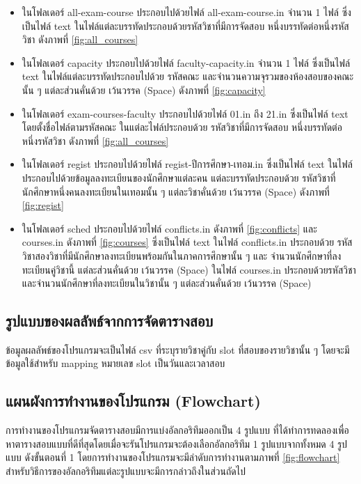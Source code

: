 \begin{itemize}
  \item ในโฟลเดอร์ all-exam-course ประกอบไปด้วยไฟล์ all-exam-course.in จำนวน 1 ไฟล์ ซึ่งเป็นไฟล์ text ในไฟล์แต่ละบรรทัดประกอบด้วยรหัสวิชาที่มีการจัดสอบ หนึ่งบรรทัดต่อหนึ่งรหัสวิชา ดังภาพที่ \ref{fig:all_courses}
  \item ในโฟลเดอร์ capacity ประกอบไปด้วยไฟล์ faculty-capacity.in จำนวน 1 ไฟล์ ซึ่งเป็นไฟล์ text ในไฟล์แต่ละบรรทัดประกอบไปด้วย รหัสคณะ และจำนวนความจุรวมของห้องสอบของคณะนั้น ๆ แต่ละส่วนคั่นด้วย เว้นวรรค (Space) ดังภาพที่ \ref{fig:capacity}
  \item ในโฟลเดอร์ exam-courses-faculty ประกอบไปด้วยไฟล์ 01.in ถึง 21.in ซึ่งเป็นไฟล์ text โดยตั้งชื่อไฟล์ตามรหัสคณะ ในแต่ละไฟล์ประกอบด้วย รหัสวิชาที่มีการจัดสอบ หนึ่งบรรทัดต่อหนึ่งรหัสวิชา ดังภาพที่ \ref{fig:all_courses} 
  \item ในโฟลเดอร์ regist ประกอบไปด้วยไฟล์ regist-ปีการศึกษา-เทอม.in ซึ่งเป็นไฟล์ text ในไฟล์ประกอบไปด้วยข้อมูลลงทะเบียนของนักศึกษาแต่ละคน แต่ละบรรทัดประกอบด้วย รหัสวิชาที่นักศึกษาหนึ่งคนลงทะเบียนในเทอมนั้น ๆ แต่ละวิชาคั่นด้วย เว้นวรรค (Space) ดังภาพที่ \ref{fig:regist}
  \item ในโฟลเดอร์ sched ประกอบไปด้วยไฟล์ conflicts.in ดังภาพที่ \ref{fig:conflicts} และ courses.in ดังภาพที่ \ref{fig:courses} ซึ่งเป็นไฟล์ text ในไฟล์ conflicts.in ประกอบด้วย รหัสวิชาสองวิชาที่มีนักศึกษาลงทะเบียนพร้อมกันในภาคการศึกษานั้น ๆ และ จำนวนนักศึกษาที่ลงทะเบียนคู่วิชานี้ แต่ละส่วนคั่นด้วย เว้นวรรค (Space) ในไฟล์ courses.in ประกอบด้วยรหัสวิชา และจำนวนนักศึกษาที่ลงทะเบียนในวิชานั้น ๆ แต่ละส่วนคั่นด้วย เว้นวรรค (Space)
\end{itemize}

\subsection{รูปแบบของผลลัพธ์จากการจัดตารางสอบ}
ข้อมูลผลลัพธ์ของโปรแกรมจะเป็นไฟล์ csv ที่ระบุรายวิชาคู่กับ slot ที่สอบของรายวิชานั้น ๆ โดยจะมีข้อมูลใช้สำหรับ mapping หมายเลข slot เป็นวันและเวลาสอบ

\subsection{แผนผังการทำงานของโปรแกรม (Flowchart)}
การทำงานของโปรแกรมจัดตารางสอบมีการแบ่งอัลกอริทึมออกเป็น 4 รูปแบบ
ที่ได้ทำการทดลองเพื่อหาตารางสอบแบบที่ดีที่สุดโดยเมื่อจะรันโปรแกรมจะต้องเลือกอัลกอริทึม 1 รูปแบบจากทั้งหมด 4 รูปแบบ ดังขั้นตอนที่ 1 
โดยการทำงานของโปรแกรมจะมีลำดับการทำงานตามภาพที่ \ref{fig:flowchart}
สำหรับวิธีการของอัลกอริทึมแต่ละรูปแบบจะมีการกล่าวถึงในส่วนถัดไป

